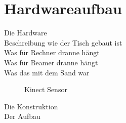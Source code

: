 \section{Hardwareaufbau}
\begin{Spacing}{\mylinespace}

Die Hardware \\

Beschreibung wie der Tisch gebaut ist\\
Was für Rechner dranne hängt\\
Was für Beamer dranne hängt\\
Was das mit dem Sand war\\

\begin{figure}[hbtp]
	\centering
	\caption{Kinect Sensor}
\end{figure}

Die Konstruktion\\
Der Aufbau

\end{Spacing}
\newpage
\clearpage
